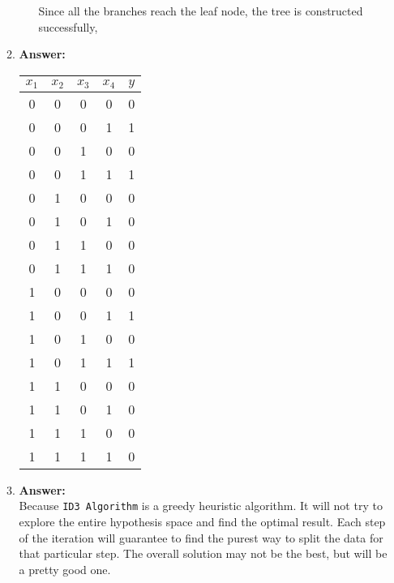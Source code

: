 \documentclass[12pt, fullpage,letterpaper]{article}
\begin{document}
\begin{enumerate}
\begin{enumerate}
\begin{itemize}
Since all the branches reach the leaf node, the tree is constructed successfully,
\end{itemize}
\item \textbf{Answer:}
\begin{table}[H]
\centering
\begin{tabular}{cccc|c}
$x_1$&$x_2$&$x_3$&$x_4$&$y$\\
\hline \hline
0&0&0&0&0\\
0&0&0&1&1\\
0&0&1&0&0\\
0&0&1&1&1\\
0&1&0&0&0\\
0&1&0&1&0\\
0&1&1&0&0\\
0&1&1&1&0\\
1&0&0&0&0\\
1&0&0&1&1\\
1&0&1&0&0\\
1&0&1&1&1\\
1&1&0&0&0\\
1&1&0&1&0\\
1&1&1&0&0\\
1&1&1&1&0\\
\end{tabular}
\end{table}
\item \textbf{Answer:}\\
Because \texttt{ID3 Algorithm} is a greedy heuristic algorithm. It will not try to explore the entire hypothesis space and find the optimal result. Each step of the iteration will guarantee to find the purest way to split the data for that particular step. The overall solution may not be the best, but will be a pretty good one.

\end{enumerate}
\end{enumerate}
\end{document}
